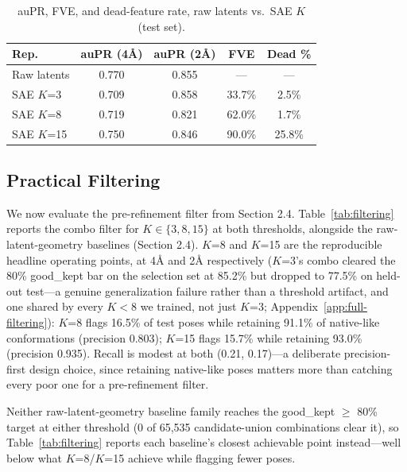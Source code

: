 \documentclass{article}
\begin{document}
\begin{table}[!ht]
\caption{auPR, FVE, and dead-feature rate, raw latents vs.\ SAE $K$ (test set).}
\label{tab:diagnostics}
\centering
\begin{small}
\begin{tabular}{lcccc}
\toprule
Rep. & auPR (4Å) & auPR (2Å) & FVE & Dead \% \\
\midrule
Raw latents & 0.770 & 0.855 &---   &---  \\
SAE $K$=3   & 0.709 & 0.858 & 33.7\% & 2.5\%  \\
SAE $K$=8   & 0.719 & 0.821 & 62.0\% & 1.7\%  \\
SAE $K$=15  & 0.750 & 0.846 & 90.0\% & 25.8\% \\
\bottomrule
\end{tabular}
\end{small}
\end{table}

\subsection{Practical Filtering}

We now evaluate the pre-refinement filter from Section 2.4. Table~\ref{tab:filtering} reports the combo filter for $K \in \{3, 8, 15\}$ at both thresholds, alongside the raw-latent-geometry baselines (Section 2.4). $K$=8 and $K$=15 are the reproducible headline operating points, at 4Å and 2Å respectively ($K$=3's combo cleared the 80\% good\_kept bar on the selection set at 85.2\% but dropped to 77.5\% on held-out test---a genuine generalization failure rather than a threshold artifact, and one shared by every $K<8$ we trained, not just $K$=3; Appendix~\ref{app:full-filtering}): $K$=8 flags 16.5\% of test poses while retaining 91.1\% of native-like conformations (precision 0.803); $K$=15 flags 15.7\% while retaining 93.0\% (precision 0.935). Recall is modest at both (0.21, 0.17)---a deliberate precision-first design choice, since retaining native-like poses matters more than catching every poor one for a pre-refinement filter.

Neither raw-latent-geometry baseline family reaches the good\_kept $\ge$ 80\% target at either threshold (0 of 65,535 candidate-union combinations clear it), so Table~\ref{tab:filtering} reports each baseline's closest achievable point instead---well below what $K$=8/$K$=15 achieve while flagging fewer poses.
\end{document}

